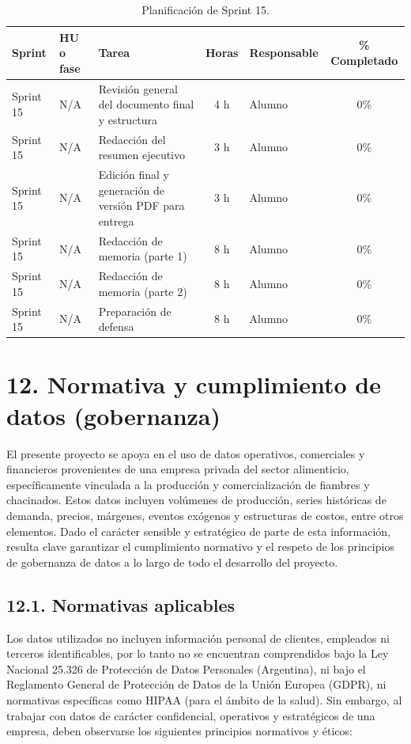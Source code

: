 \documentclass[
11pt, %
]{charter}
\begin{document}
\begin{table}[htpb]
\centering
\caption{Planificación de Sprint 15.}
\begin{tabularx}{\linewidth}{@{}|l|l|X|c|l|c|@{}}
\hline
\rowcolor[HTML]{C0C0C0}
Sprint & HU o fase & Tarea & Horas & Responsable & \% Completado \\ \hline
Sprint 15 & N/A & Revisión general del documento final y estructura & 4 h & Alumno & 0\% \\ \hline
Sprint 15 & N/A & Redacción del resumen ejecutivo & 3 h & Alumno & 0\% \\ \hline
Sprint 15 & N/A & Edición final y generación de versión PDF para entrega & 3 h & Alumno & 0\% \\ \hline
Sprint 15 & N/A & Redacción de memoria (parte 1) & 8 h & Alumno & 0\% \\ \hline
Sprint 15 & N/A & Redacción de memoria (parte 2) & 8 h & Alumno & 0\% \\ \hline
Sprint 15 & N/A & Preparación de defensa & 8 h & Alumno & 0\% \\ \hline
\end{tabularx}
\end{table}


\section{12. Normativa y cumplimiento de datos (gobernanza)}

El presente proyecto se apoya en el uso de datos operativos, comerciales y financieros provenientes de una empresa privada del sector alimenticio, específicamente vinculada a la producción y comercialización de fiambres y chacinados. Estos datos incluyen volúmenes de producción, series históricas de demanda, precios, márgenes, eventos exógenos y estructuras de costos, entre otros elementos. Dado el carácter sensible y estratégico de parte de esta información, resulta clave garantizar el cumplimiento normativo y el respeto de los principios de gobernanza de datos a lo largo de todo el desarrollo del proyecto.

\subsection*{12.1. Normativas aplicables}

Los datos utilizados no incluyen información personal de clientes, empleados ni terceros identificables, por lo tanto no se encuentran comprendidos bajo la Ley Nacional 25.326 de Protección de Datos Personales (Argentina), ni bajo el Reglamento General de Protección de Datos de la Unión Europea (GDPR), ni normativas específicas como HIPAA (para el ámbito de la salud). Sin embargo, al trabajar con datos de carácter confidencial, operativos y estratégicos de una empresa, deben observarse los siguientes principios normativos y éticos:
\end{document}
